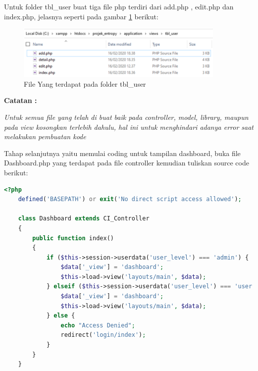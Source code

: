 Untuk folder tbl\_user buat tiga file php terdiri dari add.php , edit.php dan index.php, jelasnya seperti pada gambar \ref{dir9} berikut:

\begin{figure}[!htbp]
	\centerline{\includegraphics[width=0.90\textwidth]{figures/dir/9.png}}
	\caption{File Yang terdapat pada folder tbl\_user}
	\label{dir9}
\end{figure}

\textbf{Catatan :}\par
\textit{Untuk semua file yang telah di buat baik pada controller, model, library, maupun pada view kosongkan terlebih dahulu, hal ini untuk menghindari adanya error saat melakukan pembuatan kode}\par



\pagebreak
Tahap selanjutnya yaitu memulai coding untuk tampilan dashboard, buka file Dashboard.php yang terdapat pada file controller kemudian tuliskan source code berikut: 



\begin{lstlisting}[language=PHP]
	<?php  
	defined('BASEPATH') or exit('No direct script access allowed');  
	
	class Dashboard extends CI_Controller  
	{  
	    public function index()  
	    {  
	        if ($this->session->userdata('user_level') === 'admin') {  
	            $data['_view'] = 'dashboard';  
	            $this->load->view('layouts/main', $data);  
	        } elseif ($this->session->userdata('user_level') === 'user') {  
	            $data['_view'] = 'dashboard';  
	            $this->load->view('layouts/main', $data);  
	        } else {  
	            echo "Access Denied";  
	            redirect('login/index');  
	        }  
	    }  
	}  
\end{lstlisting}

